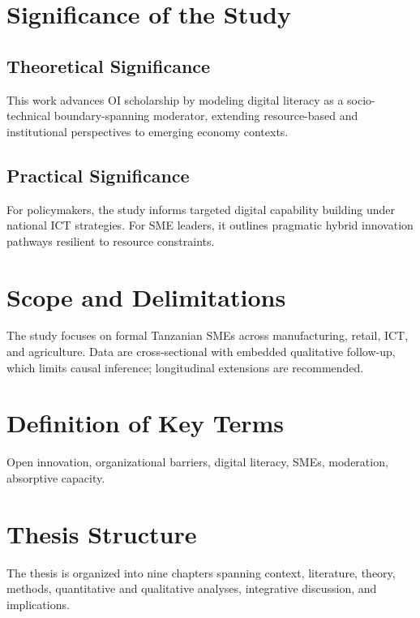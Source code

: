 \section{Significance of the Study}\label{sec:significance}
\subsection{Theoretical Significance}
This work advances OI scholarship by modeling digital literacy as a socio-technical boundary-spanning moderator, extending resource-based and institutional perspectives to emerging economy contexts.

\subsection{Practical Significance}
For policymakers, the study informs targeted digital capability building under national ICT strategies. For SME leaders, it outlines pragmatic hybrid innovation pathways resilient to resource constraints.

\section{Scope and Delimitations}\label{sec:scope}
The study focuses on formal Tanzanian SMEs across manufacturing, retail, ICT, and agriculture. Data are cross-sectional with embedded qualitative follow-up, which limits causal inference; longitudinal extensions are recommended.

\section{Definition of Key Terms}\label{sec:definitions}
Open innovation, organizational barriers, digital literacy, SMEs, moderation, absorptive capacity.

\section{Thesis Structure}\label{sec:structure}
The thesis is organized into nine chapters spanning context, literature, theory, methods, quantitative and qualitative analyses, integrative discussion, and implications.

